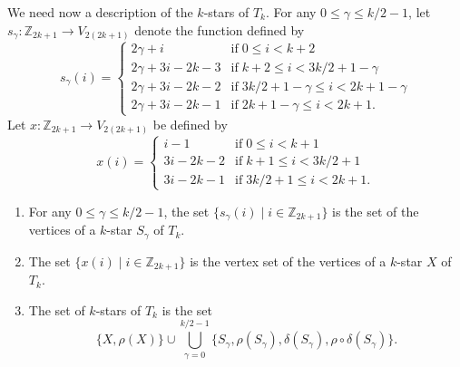 \documentclass[12pt]{amsart}
\begin{document}
We need now a description of the $k$-stars of $T_k$. For any $0\le\gamma\le k/2-1$, let $s_\gamma:\mathbb{Z}_{2k+1}\to V_{2(2k+1)}$ denote the function defined by
$$s_{\gamma}(i)=\left\{\begin{array}{ll}
2\gamma+i  &  \mathrm{if}\;0\le i< k+2 \\
2\gamma+3i-2k-3  &  \mathrm{if}\;k+2\le i< 3k/2+1-\gamma \\
2\gamma+3i-2k-2  &  \mathrm{if}\;3k/2+1-\gamma\le i< 2k+1-\gamma \\
2\gamma+3i-2k-1  &  \mathrm{if}\;2k+1-\gamma\le i< 2k+1.
\end{array}\right.$$
Let $x:\mathbb{Z}_{2k+1}\to V_{2(2k+1)}$ be defined by
$$x(i)=\left\{\begin{array}{ll}
i-1  &  \mathrm{if}\;0\le i< k+1 \\
3i-2k-2  &  \mathrm{if}\;k+1\le i< 3k/2+1 \\
3i-2k-1  &  \mathrm{if}\;3k/2+1\le i< 2k+1.
\end{array}\right.$$

\begin{lemma}
\begin{enumerate}
\item For any $0\le\gamma\le k/2-1$, the set $\{s_{\gamma}(i)\;|\; i\in\mathbb{Z}_{2k+1}\}$ is the set of the vertices of a $k$-star $S_{\gamma}$ of $T_k$.
\item The set $\{x(i)\;|\; i\in\mathbb{Z}_{2k+1}\}$ is the vertex set of the vertices of a $k$-star $X$ of $T_k$.
\item The set of $k$-stars of $T_k$ is the set
$$\{X,\rho(X)\}\cup\bigcup_{\gamma=0}^{k/2-1}\{S_{\gamma}, \rho(S_{\gamma}),\delta(S_{\gamma}),\rho\circ\delta(S_{\gamma})\}.$$
\end{enumerate}
\end{lemma}
\end{document}
